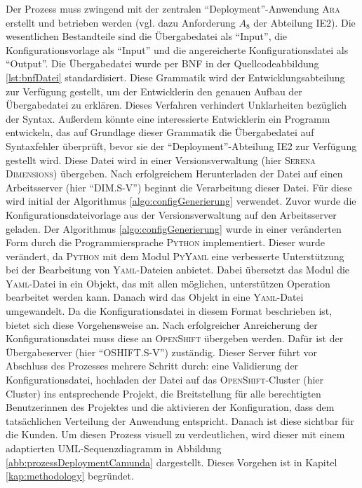 Der Prozess muss zwingend mit der zentralen \enquote{Deployment}-Anwendung \textsc{Ara} erstellt und betrieben werden (vgl. dazu Anforderung $A_{8}$ der Abteilung \ac{IE2}). Die wesentlichen Bestandteile sind die Übergabedatei als \enquote{Input}, die Konfigurationsvorlage als \enquote{Input} und die angereicherte Konfigurationsdatei als \enquote{Output}. Die Übergabedatei wurde per \ac{BNF} in der Quellcodeabbildung \vref{lst:bnfDatei} standardisiert. Diese Grammatik wird der Entwicklungsabteilung zur Verfügung gestellt, um der Entwicklerin den genauen Aufbau der Übergabedatei zu erklären. Dieses Verfahren verhindert Unklarheiten bezüglich der Syntax. Außerdem könnte eine interessierte Entwicklerin ein Programm entwickeln, das auf Grundlage dieser Grammatik die Übergabedatei auf Syntaxfehler überprüft, bevor sie der \enquote{Deployment}-Abteilung \ac{IE2} zur Verfügung gestellt wird. Diese Datei wird in einer Versionsverwaltung (hier \textsc{Serena Dimensions}) übergeben. Nach erfolgreichem Herunterladen der Datei auf einen Arbeitsserver (hier \enquote{DIM.S-V}) beginnt die Verarbeitung dieser Datei. Für diese wird initial der Algorithmus \vref{algo:configGenerierung} verwendet. Zuvor wurde die Konfigurationsdateivorlage aus der Versionsverwaltung auf den Arbeitsserver geladen. Der Algorithmus \vref{algo:configGenerierung} wurde in einer veränderten Form durch die Programmiersprache \textsc{Python} implementiert. Dieser wurde verändert, da \textsc{Python} mit dem Modul \textsc{PyYaml} eine verbesserte Unterstützung bei der Bearbeitung von \textsc{Yaml}-Dateien anbietet. Dabei übersetzt das Modul die \textsc{Yaml}-Datei in ein Objekt, das mit allen möglichen, unterstützen Operation bearbeitet werden kann. Danach wird das Objekt in eine \textsc{Yaml}-Datei umgewandelt. Da die Konfigurationsdatei in diesem Format beschrieben ist, bietet sich diese Vorgehensweise an. Nach erfolgreicher Anreicherung der Konfigurationsdatei muss diese an \textsc{OpenShift} übergeben werden. Dafür ist der Übergabeserver (hier \enquote{OSHIFT.S-V}) zuständig. Dieser Server führt vor Abschluss des Prozesses mehrere Schritt durch: eine Validierung der Konfigurationsdatei, hochladen der Datei auf das \textsc{OpenShift}-Cluster (hier Cluster) ins entsprechende Projekt, die Breitstellung für alle berechtigten Benutzerinnen des Projektes und die aktivieren der Konfiguration, dass dem tatsächlichen Verteilung der Anwendung entspricht. Danach ist diese sichtbar für die Kunden. Um diesen Prozess visuell zu verdeutlichen, wird dieser mit einem adaptierten \ac{UML}-Sequenzdiagramm in Abbildung \vref{abb:prozessDeploymentCamunda} dargestellt. Dieses Vorgehen ist in Kapitel \vref{kap:methodology} begründet.

